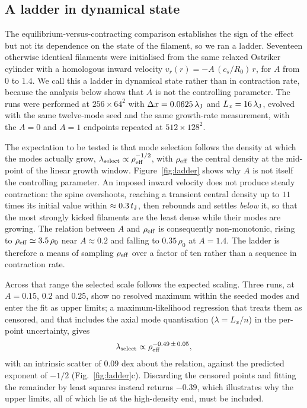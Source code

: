 \documentclass[usenatbib,twoside,twocolumn]{mnras}
\begin{document}
\subsection{A ladder in dynamical state}
\label{sec:ladder}

The equilibrium-versus-contracting comparison establishes the sign of the effect but not its dependence on the state of the filament, so we ran a ladder. Seventeen otherwise identical filaments were initialised from the same relaxed Ostriker cylinder with a homologous inward velocity $v_r(r)=-A\,(c_s/R_0)\,r$, for $A$ from $0$ to $1.4$. We call this a ladder in dynamical state rather than in contraction rate, because the analysis below shows that $A$ is not the controlling parameter. The runs were performed at $256\times64^2$ with $\Delta x=0.0625\,\lambda_{\rm J}$ and $L_x=16\,\lambda_{\rm J}$, evolved with the same twelve-mode seed and the same growth-rate measurement, with the $A=0$ and $A=1$ endpoints repeated at $512\times128^2$.

The expectation to be tested is that mode selection follows the density at which the modes actually grow, $\lambda_{\rm select}\propto\rho_{\rm eff}^{-1/2}$, with $\rho_{\rm eff}$ the central density at the mid-point of the linear growth window. Figure~\ref{fig:ladder} shows why $A$ is not itself the controlling parameter. An imposed inward velocity does not produce steady contraction: the spine overshoots, reaching a transient central density up to $11$ times its initial value within $\approx0.3\,t_{\rm J}$, then rebounds and settles \emph{below} it, so that the most strongly kicked filaments are the least dense while their modes are growing. The relation between $A$ and $\rho_{\rm eff}$ is consequently non-monotonic, rising to $\rho_{\rm eff}\simeq3.5\,\rho_0$ near $A\approx0.2$ and falling to $0.35\,\rho_0$ at $A=1.4$. The ladder is therefore a means of sampling $\rho_{\rm eff}$ over a factor of ten rather than a sequence in contraction rate.

Across that range the selected scale follows the expected scaling. Three runs, at $A=0.15$, $0.2$ and $0.25$, show no resolved maximum within the seeded modes and enter the fit as upper limits; a maximum-likelihood regression that treats them as censored, and that includes the axial mode quantisation ($\lambda=L_x/n$) in the per-point uncertainty, gives
\begin{equation}
\lambda_{\rm select}\propto\rho_{\rm eff}^{-0.49\,\pm\,0.05},
\label{eq:ladderfit}
\end{equation}
with an intrinsic scatter of $0.09$ dex about the relation, against the predicted exponent of $-1/2$ (Fig.~\ref{fig:ladder}c). Discarding the censored points and fitting the remainder by least squares instead returns $-0.39$, which illustrates why the upper limits, all of which lie at the high-density end, must be included.
\end{document}
